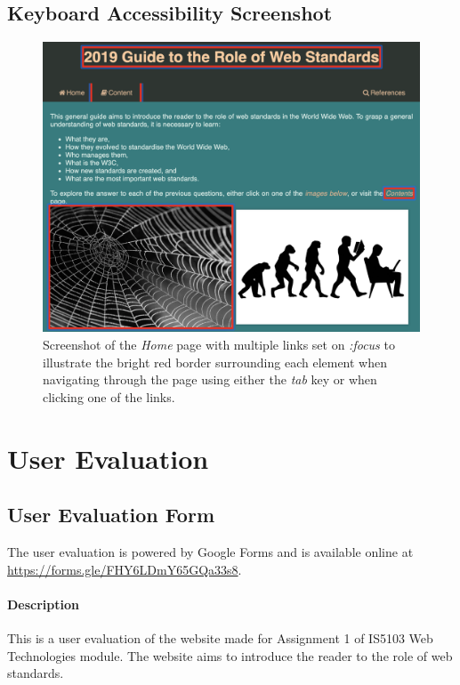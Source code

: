 \documentclass[letterpaper,12pt]{article}
\begin{document}
\begin{appendices}
\subsection{Keyboard Accessibility Screenshot}
\label{sec:appendix-accessibility-results-keyboard}

\begin{figure}[h] 
\centerline{\includegraphics[width=\textwidth]{report/images/border-focus.png}}
\caption{\label{fig:border-focus}Screenshot of the \textit{Home} page with multiple links set on \textit{:focus} to illustrate the bright red border surrounding each element when navigating through the page using either the \textit{tab} key or when clicking one of the links.}
\end{figure}

\clearpage
\section{User Evaluation}

\subsection{User Evaluation Form}
\label{sec:appendix-user-evaluation-form}

The user evaluation is powered by Google Forms and is available online at \url{https://forms.gle/FHY6LDmY65GQa33s8}.

\paragraph{Description} This is a user evaluation of the website made for Assignment 1 of IS5103 Web Technologies module. The website aims to introduce the reader to the role of web standards.\\


\end{appendices}
\end{document}
